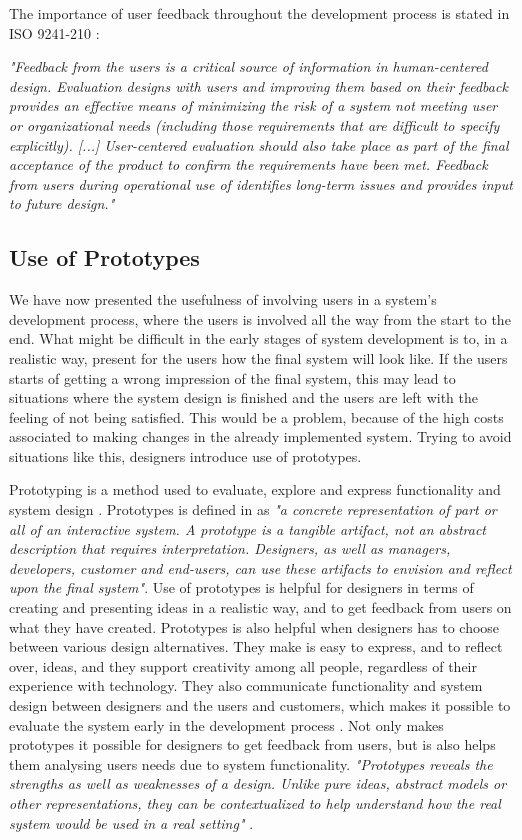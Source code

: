 The importance of user feedback throughout the development process is stated in ISO 9241-210 \cite{dis20109241}:

\emph{"Feedback from the users is a critical source of information in human-centered design. Evaluation designs with users and improving them based on their feedback provides an effective means of minimizing the risk of a system not meeting user or organizational needs (including those requirements that are difficult to specify explicitly).  [...] User-centered evaluation should also take place as part of the final acceptance of the product to confirm the requirements have been met. Feedback from users during operational use of identifies long-term issues and provides input to future design."}

\subsection{Use of Prototypes}
\label{sec:prototypes}
We have now presented the usefulness of involving users in a system's development process, where the users is involved all the way from the start to the end. What might be difficult in the early stages of system development is to, in a realistic way, present for the users how the final system will look like. If the users starts of getting a wrong impression of the final system, this may lead to situations where the system design is finished and the users are left with the feeling of not being satisfied. This would be a problem, because of the high costs associated to making changes in the already implemented system. Trying to avoid situations like this, designers introduce use of prototypes. 

Prototyping is a method used to evaluate, explore and express functionality and system design \cite{houde1997prototypes}. Prototypes is defined in \cite{mackayprototyping} as \emph{"a concrete representation of part or all of an interactive system. A prototype is a tangible artifact, not an abstract description that requires interpretation. Designers, as well as managers, developers, customer and end-users, can use these artifacts to envision and reflect upon the final system"}. Use of prototypes is helpful for designers in terms of creating and presenting ideas in a realistic way, and to get feedback from users on what they have created. Prototypes is also helpful when designers has to choose between various design alternatives. They make is easy to express, and to reflect over, ideas, and they support creativity among all people, regardless of their experience with technology. They also communicate functionality and system design between designers and the users and customers, which makes it possible to evaluate the system early in the development process \cite{mackayprototyping}. Not only makes prototypes it possible for designers to get feedback from users, but is also helps them analysing users needs due to system functionality. \emph{"Prototypes reveals the strengths as well as weaknesses of a design. Unlike pure ideas, abstract models or other representations, they can be contextualized to help understand how the real system would be used in a real setting"} \cite{mackayprototyping}.



